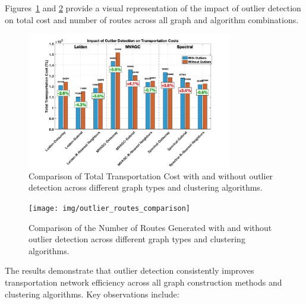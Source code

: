 Figures~\ref{fig:outlier_cost_comparison} and \ref{fig:outlier_routes_comparison} provide a visual representation of the impact of outlier detection on total cost and number of routes across all graph and algorithm combinations.

\begin{figure}[h]
    \centering
    \includegraphics[width=0.8\textwidth]{img/outlier_cost_comparison}
    \caption{Comparison of Total Transportation Cost with and without outlier detection across different graph types and clustering algorithms.}
    \label{fig:outlier_cost_comparison}
\end{figure}

\begin{figure}[h]
    \centering
    \texttt{[image: img/outlier\_routes\_comparison]}
    \caption{Comparison of the Number of Routes Generated with and without outlier detection across different graph types and clustering algorithms.}
    \label{fig:outlier_routes_comparison}
\end{figure}

The results demonstrate that outlier detection consistently improves transportation network efficiency across all graph construction methods and clustering algorithms. Key observations include:

